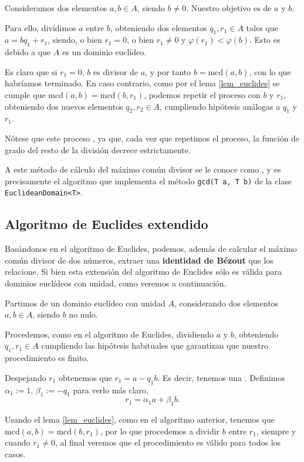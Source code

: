 \documentclass[a4paper, 11pt, twoside, notitlepage, openany, onecolumn, final]{report}
\begin{document}
	Consideramos dos elementos $a,b\in A$, siendo $b\not=0$. Nuestro objetivo es  de $a$ y $b$.
	
	Para ello, dividimos $a$ entre $b$, obteniendo dos elementos $q_1,r_1\in A$ tales que $a=bq_1+r_1$, siendo, o bien $r_1=0$, o bien $r_1\not=0$ y $\varphi(r_1)<\varphi(b)$. Esto es debido a que $A$ es un dominio euclídeo.
	
	Es claro que si $r_1=0$, $b$ es divisor de $a$, y por tanto $b=\text{mcd}(a,b)$, con lo que habríamos terminado. En caso contrario, como por el lema \eqref{lem_euclides} se cumple que $\text{mcd}(a,b)=\text{mcd}(b,r_1)$, podemos repetir el proceso con $b$ y $r_1$, obteniendo dos nuevos elementos $q_2,r_2\in A$, cumpliendo hipótesis análogas a $q_1$ y $r_1$.
	
	Nótese que este proceso , ya que, cada vez que repetimos el proceso, la función de grado del resto de la división decrece estrictamente.
	
	A este método de cálculo del máximo común divisor se le conoce como , y es precisamente el algoritmo que implementa el método \texttt{gcd(T a, T b)} de la clase \texttt{EuclideanDomain<T>}.
	\subsection{Algoritmo de Euclides extendido}
	Basándonos en el algoritmo de Euclides, podemos, además de calcular el máximo común divisor de dos números, extraer una \textbf{identidad de Bézout} que los relacione. Si bien esta extensión del algoritmo de Euclides sólo es válida para dominios euclídeos con unidad, como veremos a continuación.
	
	Partimos de un dominio euclídeo con unidad $A$, considerando dos elementos $a,b\in A$, siendo $b$ no nulo.
	
	Procedemos, como en el algoritmo de Euclides, dividiendo $a$ y $b$, obteniendo $q_1,r_1\in A$ cumpliendo las hipótesis habituales que garantizan que nuestro procedimiento es finito.
	
	Despejando $r_1$ obtenemos que $r_1=a-q_1b$. Es decir, tenemos una . Definimos $\alpha_1:=1$, $\beta_1:=-q_1$ para verlo más claro, \begin{equation*}
		r_1 = \alpha_1a +\beta_1b.
	\end{equation*}
	
	Usando el lema \eqref{lem_euclides}, como en el algoritmo anterior, tenemos que $\text{mcd}(a,b)=\text{mcd}(b,r_1)$, por lo que procedemos a dividir $b$ entre $r_1$, siempre y cuando $r_1\not=0$, al final veremos que el procedimiento es válido para todos los casos.
	
\end{document}
